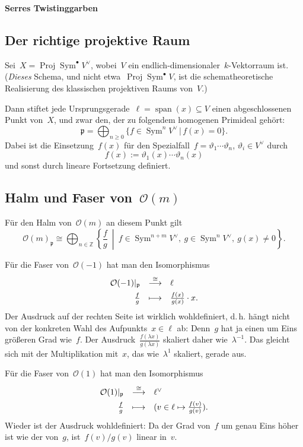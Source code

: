 \documentclass[a4paper,ngerman]{scrartcl}
\renewcommand{\O}{\mathcal{O}}
\newcommand{\ZZ}{\mathbb{Z}}
\DeclareMathOperator{\Span}{span}
\DeclareMathOperator{\Proj}{Proj}
\DeclareMathOperator{\Sym}{Sym}
\begin{document}
\begin{center}\Large\textbf{\textsf{Serres Twistinggarben}}\end{center}

\subsection*{Der richtige projektive Raum}

Sei~$X = \Proj \Sym^\bullet V^\vee$, wobei~$V$ ein endlich-dimensionaler~$k$-Vektorraum
ist. (\emph{Dieses} Schema, und nicht etwa~$\Proj \Sym^\bullet V$, ist die
schematheoretische Realisierung des klassischen projektiven Raums von~$V$.)

Dann stiftet jede Ursprungsgerade~$\ell = \Span(x) \subseteq V$ einen
abgeschlossenen Punkt von~$X$, und zwar den, der zu folgendem homogenen Primideal gehört:
\[ \mathfrak{p} = \bigoplus_{n \geq 0} \{ f \in \Sym^n V^\vee \,|\, f(x) = 0
\}. \]
Dabei ist die Einsetzung~$f(x)$ für den Spezialfall~$f = \vartheta_1 \cdots
\vartheta_n$, $\vartheta_i \in V^\vee$ durch
\[ f(x) := \vartheta_1(x) \cdots \vartheta_n(x) \]
und sonst durch lineare Fortsetzung definiert.

\subsection*{Halm und Faser von~$\O(m)$}

Für den Halm von~$\O(m)$ an diesem Punkt gilt
\[ \O(m)_\mathfrak{p} \cong
  \bigoplus_{n \in \ZZ}
  \left\{ \frac{f}{g} \ \middle|\  f \in \Sym^{n+m} V^\vee,\ g \in \Sym^n V^\vee,\ 
    g(x) \neq 0 \right\}. \]

Für die Faser von~$\O(-1)$ hat man den Isomorphismus
\[ \renewcommand{\arraystretch}{1.5}\begin{array}{@{}rcl@{}}
  \O(-1)|_\mathfrak{p} &\stackrel{\cong}{\longrightarrow}&
    \ell \\
  \frac{f}{g} &\longmapsto& \frac{f(x)}{g(x)} \cdot x.
\end{array} \]
Der Ausdruck auf der rechten Seite ist wirklich wohldefiniert, d.\,h. hängt
nicht von der konkreten Wahl des Aufpunkts~$x \in \ell$ ab: Denn~$g$ hat ja
einen um Eins größeren Grad wie~$f$. Der Ausdruck~$\frac{f(\lambda
x)}{g(\lambda x)}$ skaliert daher wie~$\lambda^{-1}$. Das gleicht sich mit der
Multiplikation mit~$x$, das wie~$\lambda^1$ skaliert, gerade aus.

Für die Faser von~$\O(1)$ hat man den Isomorphismus
\[ \renewcommand{\arraystretch}{1.5}\begin{array}{@{}rcl@{}}
  \O(1)|_\mathfrak{p} &\stackrel{\cong}{\longrightarrow}&
    \ell^\vee \\
  \frac{f}{g} &\longmapsto& (v \in \ell \mapsto \frac{f(v)}{g(v)}).
\end{array} \]
Wieder ist der Ausdruck wohldefiniert: Da der Grad von~$f$ um genau Eins höher
ist wie der von~$g$, ist~$f(v) / g(v)$ linear in~$v$.
\end{document}
